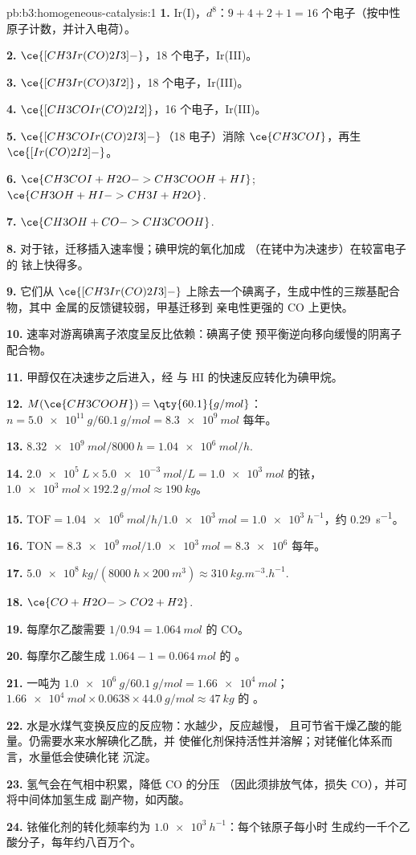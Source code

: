 \begin{solution}{pb:b3:homogeneous-catalysis:1}
\textbf{1.} Ir(I)，$d^8$：$9 + 4 + 2 + 1 = 16$ 个电子（按中性原子计数，并计入电荷）。

\textbf{2.} $\ce{[CH3Ir(CO)2I3]-}$，18 个电子，Ir(III)。

\textbf{3.} $\ce{[CH3Ir(CO)3I2]}$，18 个电子，Ir(III)。

\textbf{4.} $\ce{[CH3COIr(CO)2I2]}$，16 个电子，Ir(III)。

\textbf{5.} $\ce{[CH3COIr(CO)2I3]-}$（18 电子）消除 $\ce{CH3COI}$，再生 $\ce{[Ir(CO)2I2]-}$。

\textbf{6.} $\ce{CH3COI + H2O -> CH3COOH + HI}$; $\ce{CH3OH + HI -> CH3I + H2O}$.

\textbf{7.} $\ce{CH3OH + CO -> CH3COOH}$.

\textbf{8.} 对于铱，迁移插入速率慢；碘甲烷的氧化加成
（在铑中为决速步）在较富电子的
铱上快得多。

\textbf{9.} 它们从 $\ce{[CH3Ir(CO)2I3]-}$ 上除去一个碘离子，生成中性的三羰基配合物，其中
金属的反馈键较弱，甲基迁移到
亲电性更强的 CO 上更快。

\textbf{10.} 速率对游离碘离子浓度呈反比依赖：碘离子使
预平衡逆向移向缓慢的阴离子配合物。

\textbf{11.} 甲醇仅在决速步之后进入，经
与 HI 的快速反应转化为碘甲烷。

\textbf{12.} $M(\ce{CH3COOH}) = \qty{60.1}{g/mol}$：$n = \qty{5.0e11}{g}/\qty{60.1}{g/mol} = \qty{8.3e9}{mol}$ 每年。

\textbf{13.} $\qty{8.32e9}{mol}/\qty{8000}{h} = \qty{1.04e6}{mol/h}$.

\textbf{14.} $\qty{2.0e5}{L} \times \qty{5.0e-3}{mol/L} = \qty{1.0e3}{mol}$ 的铱，$\qty{1.0e3}{mol} \times \qty{192.2}{g/mol} \approx \qty{190}{kg}$。

\textbf{15.} $\mathrm{TOF} = \qty{1.04e6}{mol/h}/\qty{1.0e3}{mol} = \qty{1.0e3}{h^{-1}}$，约 \qty{0.29}{s^{-1}}。

\textbf{16.} $\mathrm{TON} = \qty{8.3e9}{mol}/\qty{1.0e3}{mol} = \num{8.3e6}$ 每年。

\textbf{17.} $\qty{5.0e8}{kg}/(\qty{8000}{h} \times \qty{200}{m^3}) \approx \qty{310}{kg.m^{-3}.h^{-1}}$.

\textbf{18.} $\ce{CO + H2O -> CO2 + H2}$.

\textbf{19.} 每摩尔乙酸需要 $1/0.94 = \qty{1.064}{mol}$ 的 CO。

\textbf{20.} 每摩尔乙酸生成 $1.064 - 1 = \qty{0.064}{mol}$ 的 。

\textbf{21.} 一吨为 $\qty{1.0e6}{g}/\qty{60.1}{g/mol} = \qty{1.66e4}{mol}$；$\qty{1.66e4}{mol} \times 0.0638 \times \qty{44.0}{g/mol} \approx \qty{47}{kg}$ 的 。

\textbf{22.} 水是水煤气变换反应的反应物：水越少，反应越慢，
且可节省干燥乙酸的能量。仍需要水来水解碘化乙酰，并
使催化剂保持活性并溶解；对铑催化体系而言，水量低会使碘化铑
沉淀。

\textbf{23.} 氢气会在气相中积累，降低 CO 的分压
（因此须排放气体，损失 CO），并可将中间体加氢生成
副产物，如丙酸。

\textbf{24.} 铱催化剂的转化频率约为 $\qty{1.0e3}{h^{-1}}$：每个铱原子每小时
生成约一千个乙酸分子，每年约八百万个。
\end{solution}
